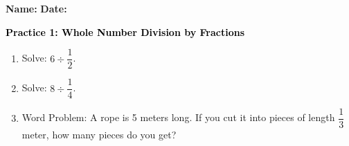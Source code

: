 \documentclass[12pt, letterpaper, fleqn]{article}
\begin{document}
\textbf{Name:} \underline{\hspace{5cm}}
\hfill
\textbf{Date:} \underline{\hspace{3cm}}\\

\begin{tcolorbox}[colback=customteal!20]
    \large\textcolor{black}{\textbf{Practice 1: Whole Number Division by Fractions}}
\end{tcolorbox}
\begin{enumerate}[itemsep=3.5cm, leftmargin=0.6cm]
\item Solve: $6 \div \dfrac{1}{2}$.
\vspace{3.5cm}
\item Solve: $8 \div \dfrac{1}{4}$.
\vspace{3.5cm}
\item Word Problem: A rope is 5 meters long. If you cut it into pieces of length $\dfrac{1}{3}$ meter, how many pieces do you get?
\end{enumerate}
\end{document}
